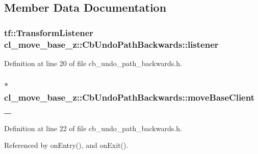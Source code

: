 \subsection{Member Data Documentation}
\subsubsection[{\texorpdfstring{listener}{listener}}]{\setlength{\rightskip}{0pt plus 5cm}tf\+::\+Transform\+Listener cl\+\_\+move\+\_\+base\+\_\+z\+::\+Cb\+Undo\+Path\+Backwards\+::listener\hspace{0.3cm}{\ttfamily [private]}}\hypertarget{classcl__move__base__z_1_1CbUndoPathBackwards_add2b6a0f1c19654a0cf07209fc123a71}{}\label{classcl__move__base__z_1_1CbUndoPathBackwards_add2b6a0f1c19654a0cf07209fc123a71}


Definition at line 20 of file cb\+\_\+undo\+\_\+path\+\_\+backwards.\+h.

\subsubsection[{\texorpdfstring{move\+Base\+Client\+\_\+}{moveBaseClient_}}]{$\ast$ cl\+\_\+move\+\_\+base\+\_\+z\+::\+Cb\+Undo\+Path\+Backwards\+::move\+Base\+Client\+\_\+\hspace{0.3cm}{\ttfamily [private]}}\hypertarget{classcl__move__base__z_1_1CbUndoPathBackwards_a306d616dab00f50141abed4bfb47aeb2}{}\label{classcl__move__base__z_1_1CbUndoPathBackwards_a306d616dab00f50141abed4bfb47aeb2}


Definition at line 22 of file cb\+\_\+undo\+\_\+path\+\_\+backwards.\+h.



Referenced by on\+Entry(), and on\+Exit().



